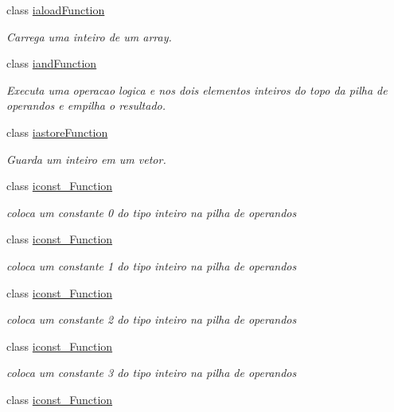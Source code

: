 \begin{DoxyCompactItemize}
class \hyperlink{classInstruction_1_1ialoadFunction}{iaload\+Function}
\begin{DoxyCompactList}\small\item\em Carrega uma inteiro de um array. \end{DoxyCompactList}\item 
class \hyperlink{classInstruction_1_1iandFunction}{iand\+Function}
\begin{DoxyCompactList}\small\item\em Executa uma operacao logica \textquotesingle{}e\textquotesingle{} nos dois elementos inteiros do topo da pilha de operandos e empilha o resultado. \end{DoxyCompactList}\item 
class \hyperlink{classInstruction_1_1iastoreFunction}{iastore\+Function}
\begin{DoxyCompactList}\small\item\em Guarda um inteiro em um vetor. \end{DoxyCompactList}\item 
class \hyperlink{classInstruction_1_1iconst__0Function}{iconst\+\_\+Function}
\begin{DoxyCompactList}\small\item\em coloca um constante 0 do tipo inteiro na pilha de operandos \end{DoxyCompactList}\item 
class \hyperlink{classInstruction_1_1iconst__1Function}{iconst\+\_\+Function}
\begin{DoxyCompactList}\small\item\em coloca um constante 1 do tipo inteiro na pilha de operandos \end{DoxyCompactList}\item 
class \hyperlink{classInstruction_1_1iconst__2Function}{iconst\+\_\+Function}
\begin{DoxyCompactList}\small\item\em coloca um constante 2 do tipo inteiro na pilha de operandos \end{DoxyCompactList}\item 
class \hyperlink{classInstruction_1_1iconst__3Function}{iconst\+\_\+Function}
\begin{DoxyCompactList}\small\item\em coloca um constante 3 do tipo inteiro na pilha de operandos \end{DoxyCompactList}\item 
class \hyperlink{classInstruction_1_1iconst__4Function}{iconst\+\_\+Function}

\end{DoxyCompactItemize}
